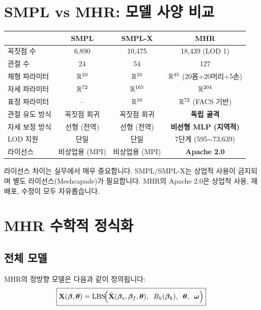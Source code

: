 \documentclass[11pt, a4paper]{report}
\begin{document}
\section{SMPL vs MHR: 모델 사양 비교}

\begin{center}
\renewcommand{\arraystretch}{1.3}
\begin{tabular}{lccc}
\toprule
& \textbf{SMPL} & \textbf{SMPL-X} & \textbf{MHR} \\
\midrule
꼭짓점 수 & 6,890 & 10,475 & 18,439 (LOD 1) \\
관절 수 & 24 & 54 & 127 \\
체형 파라미터 & $\mathbb{R}^{10}$ & $\mathbb{R}^{10}$ & $\mathbb{R}^{45}$ (20몸+20머리+5손) \\
자세 파라미터 & $\mathbb{R}^{72}$ & $\mathbb{R}^{165}$ & $\mathbb{R}^{204}$ \\
표정 파라미터 & -- & $\mathbb{R}^{10}$ & $\mathbb{R}^{72}$ (FACS 기반) \\
관절 유도 방식 & 꼭짓점 회귀 & 꼭짓점 회귀 & \textbf{독립 골격} \\
자세 보정 방식 & 선형 (전역) & 선형 (전역) & \textbf{비선형 MLP (지역적)} \\
LOD 지원 & 단일 & 단일 & 7단계 (595$\sim$73,639) \\
라이선스 & 비상업용 (MPI) & 비상업용 (MPI) & \textbf{Apache 2.0} \\
\bottomrule
\end{tabular}
\end{center}

\begin{importantnote}
라이선스 차이는 실무에서 매우 중요합니다. SMPL/SMPL-X는 상업적 사용이 금지되며 별도 라이선스(Meshcapade)가 필요합니다. MHR의 Apache 2.0은 상업적 사용, 재배포, 수정이 모두 자유롭습니다.
\end{importantnote}


\section{MHR 수학적 정식화}

\subsection{전체 모델}

MHR의 정방향 모델은 다음과 같이 정의됩니다:
\begin{equation}
\boxed{
\mathbf{X}(\bm{\beta}, \bm{\theta}) = \mathrm{LBS}\!\Big( \tilde{\mathbf{X}}(\bm{\beta}_s, \bm{\beta}_f, \bm{\theta}),\;\; B_k(\bm{\beta}_k),\;\; \bm{\theta},\;\; \bm{\omega} \Big)
}
\label{eq:mhr_full}
\end{equation}
\end{document}
